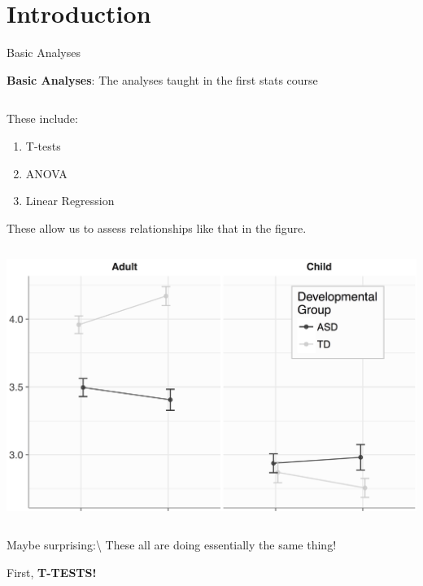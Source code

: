 \section{Introduction}\label{introduction}

\begin{frame}{Basic Analyses}

\center
\textbf{Basic Analyses}: The analyses taught in the first stats course
\vspace{12pt}

\columnsbegin

\begin{column}{0.48\textwidth}
   These include:
   \begin{enumerate}
   \item T-tests
   \item ANOVA
   \item Linear Regression
   \end{enumerate}
   These allow us to assess relationships like that in the figure.
\end{column}\begin{column}{0.48\textwidth}
    \begin{center}
     \includegraphics[width=\textwidth]{Figures/FigureInteraction.jpg}
     \end{center}
\end{column}

\columnsend

\vspace{12pt} Maybe surprising:\textbackslash{} These all are doing
essentially the same thing!

First, \textbf{T-TESTS!}

\end{frame}

